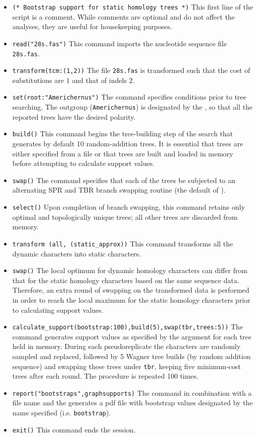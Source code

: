 \begin{itemize}
\item \texttt{(* Bootstrap support for static homology trees *)} This first line of the script is a comment. While
 comments are optional and do not affect the analyses, they are useful for housekeeping purposes.
\item \texttt{read("28s.fas")} This command imports the nucleotide sequence file \texttt{28s.fas}.
\item \texttt{transform(tcm:(1,2))} The file \texttt{28s.fas} is transformed such that the cost of substitutions 
are $1$ and that of indels $2$.
\item \texttt{set(root:"Americhernus")} The  command specifies conditions prior to tree 
searching. The outgroup (\texttt{Americhernus}) is designated by the , so that all the reported 
trees have the desired polarity.     
\item \texttt{build()} This command begins the tree-building step of the search that generates by default 10 
random-addition trees. It is essential that trees are either specified from a file or that trees are built and loaded in 
memory before attempting to calculate support values.
\item \texttt{swap()} The  command specifies that each of the trees be subjected to an 
alternating SPR and TBR branch swapping routine (the default of \poy).
\item \texttt{select()} Upon completion of branch swapping, this command retains only optimal and topologically 
unique trees; all other trees are discarded from memory. 
\item \texttt{transform (all, (static\_approx))} This command transforms all the dynamic characters into static characters.
\item \texttt{swap()} The local optimum for dynamic homology characters can differ from that for the static 
homology characters based on the same sequence data. Therefore, an extra round of swapping on the transformed 
data is performed in order to reach the local maximum for the static homology characters prior to calculating support values.
\item \texttt{calculate\_support(bootstrap:100),build(5),swap(tbr,trees:5))} The  
command generates support values as specified by the  argument for each tree held in 
memory. During each pseudoreplicate the characters are randomly sampled and replaced, followed by 5 Wagner 
tree builds (by random addition sequence) and swapping these trees under \texttt{tbr}, keeping five minimum-cost trees
after each round. The procedure is repeated 100 times.
\item \texttt{report("bootstraps",graphsupports)}  The  command in combination with 
a file name and the  generates a pdf file with bootstrap values designated by the 
name specified (i.e. \texttt{bootstrap}). 
\item \texttt{exit()} This command ends the \poy session.
\end{itemize}

